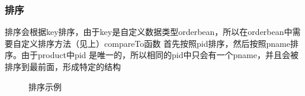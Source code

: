 \documentclass[a4paper,UTF8]{article}
\numberwithin{equation}{section}
\begin{document}
\subsubsection{排序}
排序会根据key排序，由于key是自定义数据类型orderbean，所以在orderbean中需要自定义排序方法（见上）compareTo函数
首先按照pid排序，然后按照pname排序。由于product中pid 是唯一的，所以相同的pid中只会有一个pname，并且会被排序到最前面，形成特定的结构
\begin{figure}[H]
    \centering
    \vfill
    \caption{排序示例}
\end{figure}
\end{document}
